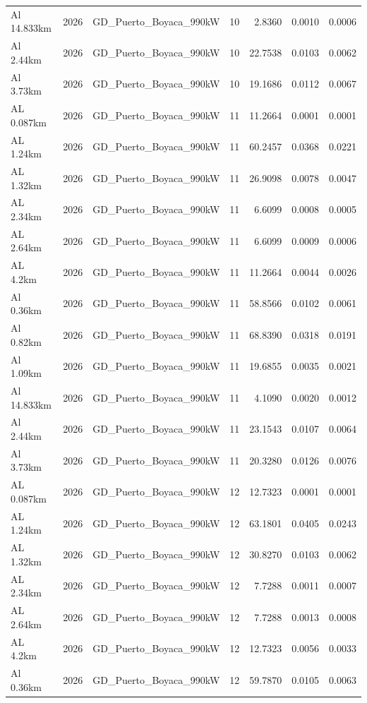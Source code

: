 \documentclass[11pt,a4paper]{article}
\begin{document}
\begin{longtable}{llllrrr}
Al 14.833km & 2026 & GD\_Puerto\_Boyaca\_990kW & 10 & 2.8360 & 0.0010 & 0.0006 \\
Al 2.44km & 2026 & GD\_Puerto\_Boyaca\_990kW & 10 & 22.7538 & 0.0103 & 0.0062 \\
Al 3.73km & 2026 & GD\_Puerto\_Boyaca\_990kW & 10 & 19.1686 & 0.0112 & 0.0067 \\
AL 0.087km & 2026 & GD\_Puerto\_Boyaca\_990kW & 11 & 11.2664 & 0.0001 & 0.0001 \\
AL 1.24km & 2026 & GD\_Puerto\_Boyaca\_990kW & 11 & 60.2457 & 0.0368 & 0.0221 \\
AL 1.32km & 2026 & GD\_Puerto\_Boyaca\_990kW & 11 & 26.9098 & 0.0078 & 0.0047 \\
AL 2.34km & 2026 & GD\_Puerto\_Boyaca\_990kW & 11 & 6.6099 & 0.0008 & 0.0005 \\
AL 2.64km & 2026 & GD\_Puerto\_Boyaca\_990kW & 11 & 6.6099 & 0.0009 & 0.0006 \\
AL 4.2km & 2026 & GD\_Puerto\_Boyaca\_990kW & 11 & 11.2664 & 0.0044 & 0.0026 \\
Al 0.36km & 2026 & GD\_Puerto\_Boyaca\_990kW & 11 & 58.8566 & 0.0102 & 0.0061 \\
Al 0.82km & 2026 & GD\_Puerto\_Boyaca\_990kW & 11 & 68.8390 & 0.0318 & 0.0191 \\
Al 1.09km & 2026 & GD\_Puerto\_Boyaca\_990kW & 11 & 19.6855 & 0.0035 & 0.0021 \\
Al 14.833km & 2026 & GD\_Puerto\_Boyaca\_990kW & 11 & 4.1090 & 0.0020 & 0.0012 \\
Al 2.44km & 2026 & GD\_Puerto\_Boyaca\_990kW & 11 & 23.1543 & 0.0107 & 0.0064 \\
Al 3.73km & 2026 & GD\_Puerto\_Boyaca\_990kW & 11 & 20.3280 & 0.0126 & 0.0076 \\
AL 0.087km & 2026 & GD\_Puerto\_Boyaca\_990kW & 12 & 12.7323 & 0.0001 & 0.0001 \\
AL 1.24km & 2026 & GD\_Puerto\_Boyaca\_990kW & 12 & 63.1801 & 0.0405 & 0.0243 \\
AL 1.32km & 2026 & GD\_Puerto\_Boyaca\_990kW & 12 & 30.8270 & 0.0103 & 0.0062 \\
AL 2.34km & 2026 & GD\_Puerto\_Boyaca\_990kW & 12 & 7.7288 & 0.0011 & 0.0007 \\
AL 2.64km & 2026 & GD\_Puerto\_Boyaca\_990kW & 12 & 7.7288 & 0.0013 & 0.0008 \\
AL 4.2km & 2026 & GD\_Puerto\_Boyaca\_990kW & 12 & 12.7323 & 0.0056 & 0.0033 \\
Al 0.36km & 2026 & GD\_Puerto\_Boyaca\_990kW & 12 & 59.7870 & 0.0105 & 0.0063 \\

\end{longtable}
\end{document}
